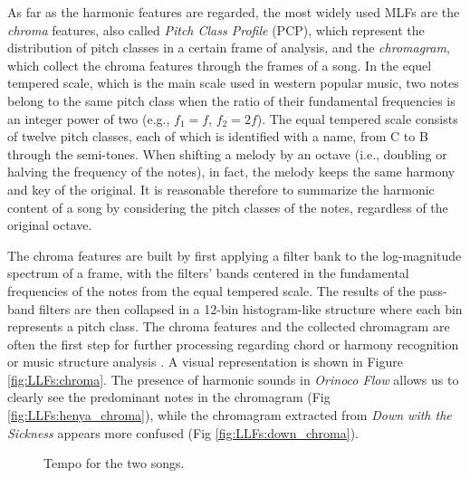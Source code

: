 As far as the harmonic features are regarded, the most widely used MLFs are the \textit{chroma} features, also called \textit{Pitch Class Profile} (PCP), which represent the distribution of pitch classes in a certain frame of analysis, and the \textit{chromagram}, which collect the chroma features through the frames of a song. In the equel tempered scale, which is the main scale used in western popular music, two notes belong to the same pitch class when the ratio of their fundamental frequencies is an integer power of two (e.g., $f_1=f$, $f_2=2f$). The equal tempered scale consists of twelve pitch classes, each of which is identified with a name, from C to B through the semi-tones. When shifting a melody by an octave (i.e., doubling or halving the frequency of the notes), in fact, the melody keeps the same harmony and key of the original. It is reasonable therefore to summarize the harmonic content of a song by considering the pitch classes of the notes, regardless of the original octave.


The chroma features are built by first applying a filter bank to the log-magnitude spectrum of a frame, with the filters' bands centered in the fundamental frequencies of the notes from the equal tempered scale. The results of the pass-band filters are then collapsed in a 12-bin histogram-like structure where each bin represents a pitch class. The chroma features and the collected chromagram are often the first step for further processing regarding chord or harmony recognition or music structure analysis \cite{Nieto2D, Digiorgi2013}. A visual representation is shown in Figure \ref{fig:LLFs:chroma}. The presence of harmonic sounds in \textit{Orinoco Flow} allows us to clearly see the predominant notes in the chromagram (Fig \ref{fig:LLFs:henya_chroma}), while the chromagram extracted from \textit{Down with the Sickness} appears more confused (Fig \ref{fig:LLFs:down_chroma}).

\begin{figure}[tb]
	\centering
	 \hfil
	\caption{Tempo for the two songs.}
	\label{fig:LLFs:tempo}          
\end{figure}

